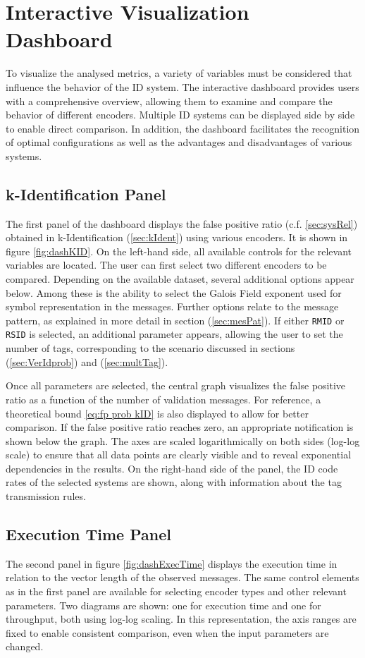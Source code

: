 \documentclass[english,BCOR=4mm,cdfont=false]{tudscrreprt} %
\begin{document}
\section{Interactive Visualization Dashboard}
\label{sec:metVis}
To visualize the analysed metrics, a variety of variables must be considered that influence the behavior of the ID system. The interactive dashboard provides users with a comprehensive overview, allowing them to examine and compare the behavior of different encoders. Multiple ID systems can be displayed side by side to enable direct comparison. In addition, the dashboard facilitates the recognition of optimal configurations as well as the advantages and disadvantages of various systems.

\subsection{k-Identification Panel}
The first panel of the dashboard displays the false positive ratio (c.f. \ref{sec:sysRel}) obtained in k-Identification (\ref{sec:kIdent}) using various encoders. It is shown in figure \ref{fig:dashKID}. On the left-hand side, all available controls for the relevant variables are located. The user can first select two different encoders to be compared. Depending on the available dataset, several additional options appear below. Among these is the ability to select the Galois Field exponent used for symbol representation in the messages. Further options relate to the message pattern, as explained in more detail in section (\ref{sec:mesPat}). If either \texttt{RMID} or \texttt{RSID} is selected, an additional parameter appears, allowing the user to set the number of tags, corresponding to the scenario discussed in sections (\ref{sec:VerIdprob}) and (\ref{sec:multTag}).

Once all parameters are selected, the central graph visualizes the false positive ratio as a function of the number of validation messages. For reference, a theoretical bound \eqref{eq:fp prob kID} is also displayed to allow for better comparison. If the false positive ratio reaches zero, an appropriate notification is shown below the graph. The axes are scaled logarithmically on both sides (log-log scale) to ensure that all data points are clearly visible and to reveal exponential dependencies in the results. On the right-hand side of the panel, the ID code rates of the selected systems are shown, along with information about the tag transmission rules.

\subsection{Execution Time Panel}
The second panel in figure \ref{fig:dashExecTime} displays the execution time in relation to the vector length of the observed messages. The same control elements as in the first panel are available for selecting encoder types and other relevant parameters. Two diagrams are shown: one for execution time and one for throughput, both using log-log scaling. In this representation, the axis ranges are fixed to enable consistent comparison, even when the input parameters are changed.
\end{document}
